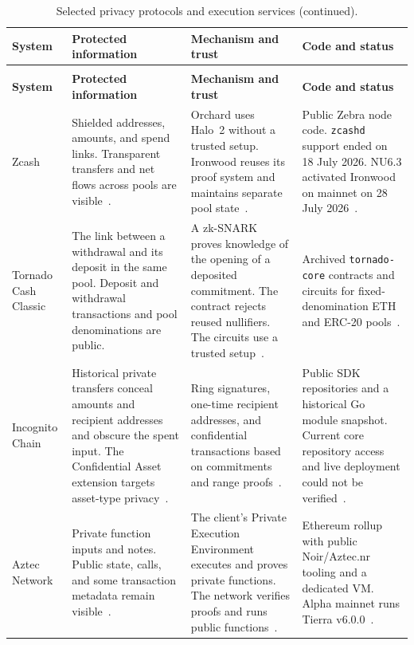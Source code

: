 \begin{longtable}{>{\raggedright\arraybackslash}m{}>{\raggedright\arraybackslash}m{}>{\raggedright\arraybackslash}m{}>{\raggedright\arraybackslash}m{}}
\caption{Selected privacy protocols and execution services.}\label{tab:privacy-platforms}\\
\toprule
\textbf{System} & \textbf{Protected information} & \textbf{Mechanism and trust} & \textbf{Code and status} \\
\midrule
\endfirsthead
\caption[]{Selected privacy protocols and execution services (continued).}\\
\toprule
\textbf{System} & \textbf{Protected information} & \textbf{Mechanism and trust} & \textbf{Code and status} \\
\midrule
\endhead
Zcash & Shielded addresses, amounts, and spend links. Transparent transfers and net flows across pools are visible~\cite{platform-zcash}. & Orchard uses Halo~2 without a trusted setup. Ironwood reuses its proof system and maintains separate pool state~\cite{platform-zcash}. & Public Zebra node code. \texttt{zcashd} support ended on 18 July 2026. NU6.3 activated Ironwood on mainnet on 28 July 2026~\cite{platform-zcash}. \\
\addlinespace[3pt]
Tornado Cash Classic & The link between a withdrawal and its deposit in the same pool. Deposit and withdrawal transactions and pool denominations are public. & A zk-SNARK proves knowledge of the opening of a deposited commitment. The contract rejects reused nullifiers. The circuits use a trusted setup~\cite{platform-tornado}. & Archived \texttt{tornado-core} contracts and circuits for fixed-denomination ETH and ERC-20 pools~\cite{platform-tornado}. \\
\addlinespace[3pt]
Incognito Chain & Historical private transfers conceal amounts and recipient addresses and obscure the spent input. The Confidential Asset extension targets asset-type privacy~\cite{platform-incognito}. & Ring signatures, one-time recipient addresses, and confidential transactions based on commitments and range proofs~\cite{platform-incognito}. & Public SDK repositories and a historical Go module snapshot. Current core repository access and live deployment could not be verified~\cite{platform-incognito}. \\
\addlinespace[3pt]
Aztec Network & Private function inputs and notes. Public state, calls, and some transaction metadata remain visible~\cite{platform-aztec}. & The client's Private Execution Environment executes and proves private functions. The network verifies proofs and runs public functions~\cite{platform-aztec}. & Ethereum rollup with public Noir/Aztec.nr tooling and a dedicated VM. Alpha mainnet runs Tierra v6.0.0~\cite{platform-aztec}. \\

\end{longtable}
